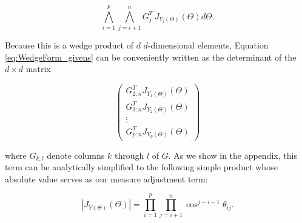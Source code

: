 \documentclass[ba]{imsart}
\numberwithin{equation}{section}
\theoremstyle{plain}
\begin{document}
\begin{equation}
\label{eq:WedgeForm_givens}
\bigwedge_{i=1}^p \bigwedge_{j=i+1}^n G_j^T\, J_{Y_i(\Theta)}(\Theta) d\Theta.
\end{equation}

\noindent Because this is a wedge product of $d$ $d$-dimensional elements, Equation \ref{eq:WedgeForm_givens} can be conveniently written as the determinant of the $d \times d$ matrix

\begin{equation}
\label{eq:measure_matrix_form}
\begin{pmatrix}
G_{2:n}^T J_{Y_1(\Theta)}(\Theta)\\
G_{3:n}^T J_{Y_2(\Theta)}(\Theta)\\
\vdots\\
G_{p:n}^T J_{Y_p(\Theta)}(\Theta)
\end{pmatrix}
\end{equation}

\noindent where $G_{k:l}$ denote columns $k$ through $l$ of $G$. As we show in the appendix, this term can be analytically simplified to the following simple product whose absolute value serves as our measure adjustment term:

\begin{equation}
\label{eq:final_change_of_measure}
|J_{Y(\Theta)}(\Theta)| = \prod_{i=1}^p \prod_{j=i+1}^n \cos^{j-i-1} \theta_{ij}.
\end{equation}


\end{document}
